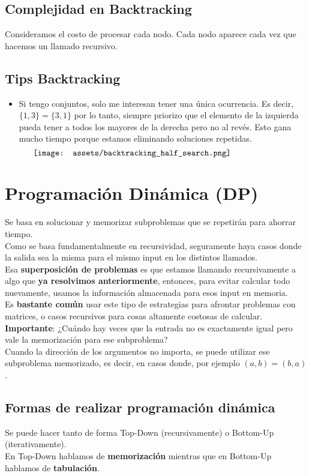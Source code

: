 \documentclass[10pt,a4paper]{article}
\begin{document}
\subsection*{Complejidad en Backtracking}
Consideramos el costo de procesar cada nodo. Cada nodo aparece cada vez que hacemos un llamado recursivo.  
\subsection*{Tips Backtracking}
\begin{itemize}
    \item Si tengo conjuntos, solo me interesan tener una única ocurrencia. Es decir, $\{1, 3\} = \{3, 1\}$ por lo tanto, siempre priorizo que el elemento de la izquierda pueda tener a todos los mayores de la derecha pero no al revés. Esto gana mucho tiempo porque estamos eliminando soluciones repetidas.
    \[\begin{minipage}[b]{0.9\textwidth}
    \texttt{[image: assets/backtracking\_half\_search.png]}
    \end{minipage}\]
\end{itemize}
\section*{Programación Dinámica (DP)}
Se basa en solucionar y memorizar subproblemas que se repetirán para ahorrar tiempo. \\
Como se basa fundamentalmente en recursividad, seguramente haya casos donde la salida sea la misma para el mismo input en los distintos llamados. \\
Esa \textbf{superposición de problemas} es que estamos llamando recursivamente a algo que \textbf{ya resolvimos anteriormente}, entonces, para evitar calcular todo nuevamente, usamos la información almacenada para esos input en memoria. \\
Es \textbf{bastante común} usar este tipo de estrategias para afrontar problemas con matrices, o casos recursivos para cosas altamente costosas de calcular. \\
\textbf{Importante}: ¿Cuándo hay veces que la entrada no es exactamente igual pero vale la memorización para ese subproblema? \\
Cuando la dirección de los argumentos no importa, se puede utilizar ese subproblema memorizado, es decir, en casos donde, por ejemplo $(a, b) = (b, a)$.
\subsection*{Formas de realizar programación dinámica}
Se puede hacer tanto de forma Top-Down (recursivamente) o Bottom-Up (iterativamente). \\
En Top-Down hablamos de \textbf{memorización} mientras que en Bottom-Up hablamos de \textbf{tabulación}. 
\end{document}
